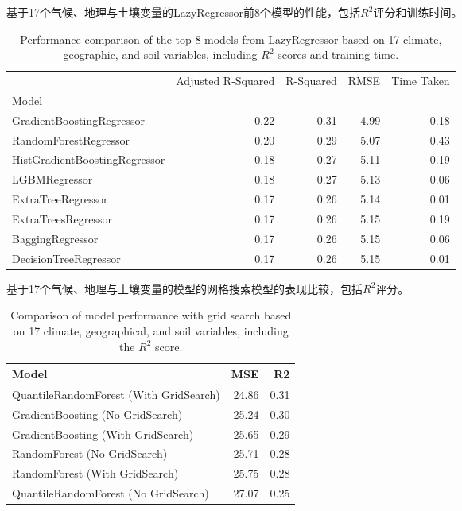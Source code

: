 \documentclass[AutoFakeBold]{LZUThesis-PgD&PhD}
\begin{document}
	\begin{table}[H]
		\centering
		\caption{基于17个气候、地理与土壤变量的LazyRegressor前8个模型的性能，包括$R^2$评分和训练时间。}
		\caption*{Performance comparison of the top 8 models from LazyRegressor based on 17 climate, geographic, and soil variables, including $R^2$ scores and training time.}
		
		\begin{tabular}{lrrrr}
			\toprule
			& Adjusted R-Squared & R-Squared & RMSE & Time Taken \\
			Model &  &  &  &  \\
			\midrule
			GradientBoostingRegressor & 0.22 & 0.31 & 4.99 & 0.18 \\
			RandomForestRegressor & 0.20 & 0.29 & 5.07 & 0.43 \\
			HistGradientBoostingRegressor & 0.18 & 0.27 & 5.11 & 0.19 \\
			LGBMRegressor & 0.18 & 0.27 & 5.13 & 0.06 \\
			ExtraTreeRegressor & 0.17 & 0.26 & 5.14 & 0.01 \\
			ExtraTreesRegressor & 0.17 & 0.26 & 5.15 & 0.19 \\
			BaggingRegressor & 0.17 & 0.26 & 5.15 & 0.06 \\
			DecisionTreeRegressor & 0.17 & 0.26 & 5.15 & 0.01 \\
			\bottomrule
		\end{tabular}
		\label{tab:models_performance}
	\end{table}
	
	
	\begin{table}[H]
		\centering
		\caption{基于17个气候、地理与土壤变量的模型的网格搜索模型的表现比较，包括$R^2$评分。}
		\caption*{Comparison of model performance with grid search based on 17 climate, geographical, and soil variables, including the $R^2$ score.}
		
		\begin{tabular}{lrr}
			\toprule
			Model & MSE & R2 \\
			\midrule
			QuantileRandomForest (With GridSearch) & 24.86 & 0.31 \\
			GradientBoosting (No GridSearch) & 25.24 & 0.30 \\
			GradientBoosting (With GridSearch) & 25.65 & 0.29 \\
			RandomForest (No GridSearch) & 25.71 & 0.28 \\
			RandomForest (With GridSearch) & 25.75 & 0.28 \\
			QuantileRandomForest (No GridSearch) & 27.07 & 0.25 \\
			\bottomrule
		\end{tabular}
	\end{table}
	
\end{document}
